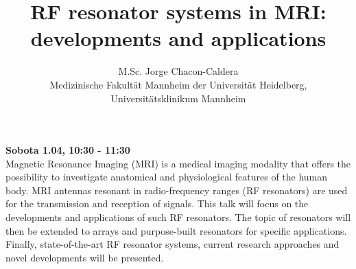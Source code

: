 \documentclass[12pt, a4paper]{article}
\begin{document}
\title{RF resonator systems in MRI: developments and applications}
\author{M.Sc. Jorge Chacon-Caldera \\Medizinische Fakultät Mannheim der Universität Heidelberg, \\Universitätsklinikum Mannheim}
\date {}
\maketitle
\thispagestyle{title}
\textbf{Sobota 1.04, 10:30 - 11:30}
\\

Magnetic Resonance Imaging (MRI) is a medical imaging modality that offers the possibility to investigate anatomical and physiological features of the human body. MRI antennas resonant in radio-frequency ranges (RF resonators) are used for the transmission and reception of signals. This talk will focus on the developments and applications of such RF resonators. The topic of resonators will then be extended to arrays and purpose-built resonators for specific applications. Finally, state-of-the-art RF resonator systems, current research approaches and novel developments will be presented.
\end{document}
